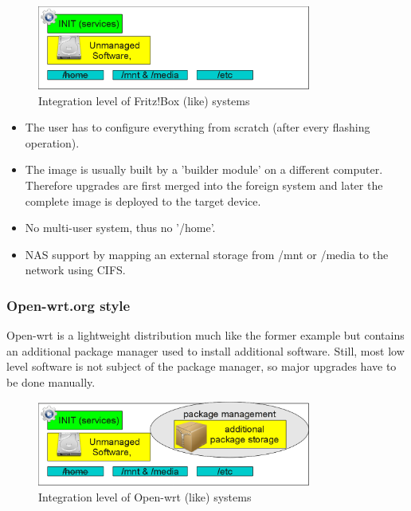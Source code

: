 \documentclass[a4paper,10pt]{article}
\begin{document}
\begin{figure}[h]
\caption[Kurzeintrag]{Integration level of Fritz!Box (like) systems}
  \centering
  \includegraphics[width=90mm]{diagrams/package_management_integration1.png}
\end{figure}

\begin{itemize}
\item The user has to configure everything from scratch (after every flashing operation).
\item The image is usually built by a 'builder module' on a different computer. Therefore upgrades are first merged into the foreign system and later the complete image is deployed to the target device.
\item No multi-user system, thus no '/home'.
\item NAS support by mapping an external storage from /mnt or /media to the network using CIFS.
\end{itemize}



\subsubsection{Open-wrt.org style}
Open-wrt is a lightweight distribution much like the former example but contains an additional package manager used to install additional software. Still, most low level software is not subject of the package manager, so major upgrades have to be done manually.

\begin{figure}[h]
\caption[Kurzeintrag]{Integration level of Open-wrt (like) systems}
  \centering
  \includegraphics[width=90mm]{diagrams/package_management_integration2.png}
\end{figure}
\end{document}
